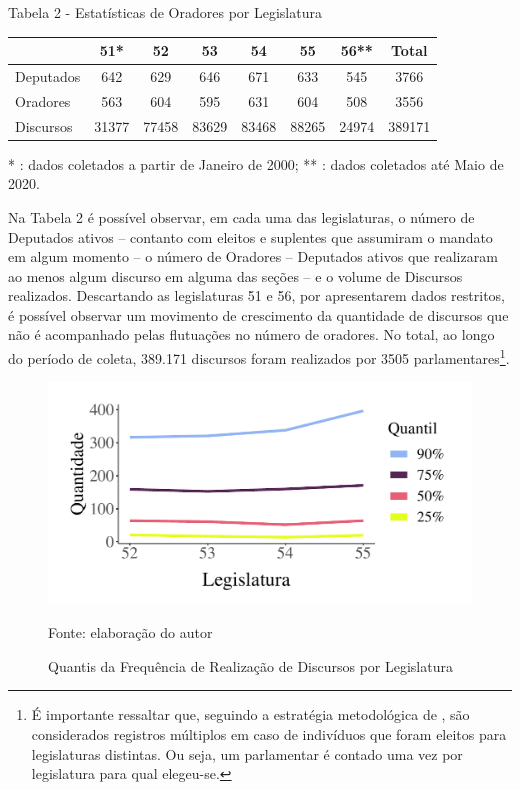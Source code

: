 \documentclass[
12pt,				%
openright,			%
twoside,			%
a4paper,			%
english,			%
french,				%
spanish,			%
brazil				%
]{abntex2}
\begin{document}
\begin{center}
	Tabela 2 - Estatísticas de Oradores por Legislatura
	
	\vspace{0.4cm}
	
	\begin{tabular}{lccccccc}
		\toprule
		{}				& {51*}		& {52} 	& {53}	& {54}	& {55}	& {56**}	& {Total}	\\ \midrule
		{Deputados} 	& 642		& 629	& 646	& 671	& 633	& 545		& 3766		\\ 
		{Oradores} 		& 563		& 604	& 595	& 631	& 604	& 508		& 3556		\\ \midrule
		{Discursos} 	& 31377		& 77458	& 83629	& 83468	& 88265	& 24974		& 389171	\\ 
		\bottomrule
	\end{tabular}
	
	\vspace{0.6cm}
	
	* : dados coletados a partir de Janeiro de 2000; ** : dados coletados até Maio de 2020.
\end{center}

Na Tabela 2 é possível observar, em cada uma das legislaturas, o número de Deputados ativos -- contanto com eleitos e suplentes que assumiram o mandato em algum momento -- o número de Oradores -- Deputados ativos que realizaram ao menos algum discurso em alguma das seções -- e o volume de Discursos realizados. Descartando as legislaturas 51 e 56, por apresentarem dados restritos, é possível observar um movimento de crescimento da quantidade de discursos que não é acompanhado pelas flutuações no número de oradores. No total, ao longo do período de coleta, 389.171 discursos foram realizados por 3505 parlamentares\footnote{É importante ressaltar que, seguindo a estratégia metodológica de , são considerados registros múltiplos em caso de indivíduos que foram eleitos para legislaturas distintas. Ou seja, um parlamentar é contado uma vez por legislatura para qual elegeu-se.}.

\begin{figure}[h]
	\caption{Quantis da Frequência de Realização de Discursos por Legislatura}
	\label{fig:quantis_discursos}
	\centering
	\includegraphics[width=.7\linewidth]{figures/quantis_discursos}
	
	Fonte: elaboração do autor
\end{figure}
\end{document}
